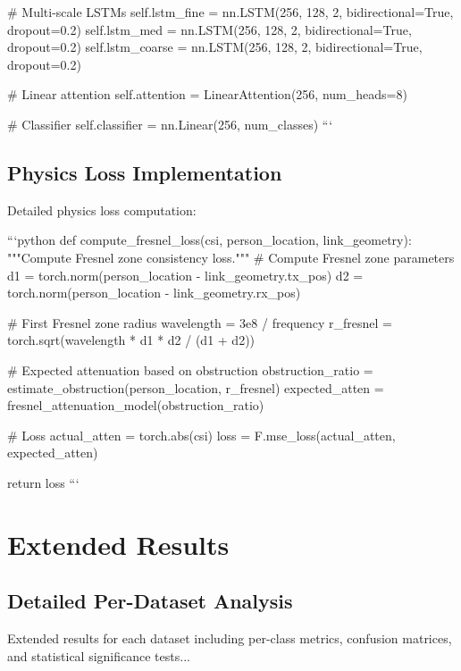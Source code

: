 \documentclass[10pt,journal,compsoc]{IEEEtran}
\begin{document}
        # Multi-scale LSTMs
        self.lstm_fine = nn.LSTM(256, 128, 2, 
                                  bidirectional=True, 
                                  dropout=0.2)
        self.lstm_med = nn.LSTM(256, 128, 2, 
                                 bidirectional=True, 
                                 dropout=0.2)
        self.lstm_coarse = nn.LSTM(256, 128, 2, 
                                    bidirectional=True, 
                                    dropout=0.2)
        
        # Linear attention
        self.attention = LinearAttention(256, num_heads=8)
        
        # Classifier
        self.classifier = nn.Linear(256, num_classes)
```

\subsection{Physics Loss Implementation}

Detailed physics loss computation:

```python
def compute_fresnel_loss(csi, person_location, link_geometry):
    """Compute Fresnel zone consistency loss."""
    # Compute Fresnel zone parameters
    d1 = torch.norm(person_location - link_geometry.tx_pos)
    d2 = torch.norm(person_location - link_geometry.rx_pos)
    
    # First Fresnel zone radius
    wavelength = 3e8 / frequency
    r_fresnel = torch.sqrt(wavelength * d1 * d2 / (d1 + d2))
    
    # Expected attenuation based on obstruction
    obstruction_ratio = estimate_obstruction(person_location, r_fresnel)
    expected_atten = fresnel_attenuation_model(obstruction_ratio)
    
    # Loss
    actual_atten = torch.abs(csi)
    loss = F.mse_loss(actual_atten, expected_atten)
    
    return loss
```

\section{Extended Results}
\label{sec:appendix_results}

\subsection{Detailed Per-Dataset Analysis}

Extended results for each dataset including per-class metrics, confusion matrices, and statistical significance tests...
\end{document}
